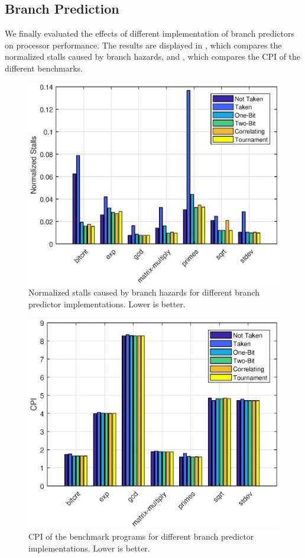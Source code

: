 \documentclass[conference,hidelinks]{IEEEtran}
\begin{document}
\subsection{Branch Prediction}

We finally evaluated the effects of different implementation of branch predictors on processor performance. The results are displayed in , which compares the normalized stalls caused by branch hazards, and , which compares the CPI of the different benchmarks.

\begin{figure}[!htb]
  \centering
  \includegraphics[width=0.8\columnwidth]{plots/bp_stalls.eps}
  \caption{Normalized stalls caused by branch hazards for different branch predictor implementations. Lower is better.}
  \label{fig:bp_stalls}
\end{figure}

\begin{figure}[!htb]
  \centering
  \includegraphics[width=0.8\columnwidth]{plots/bp_cpi.eps}
  \caption{CPI of the benchmark programs for different branch predictor implementations. Lower is better.}
  \label{fig:bp_cpi}
\end{figure}
\end{document}
